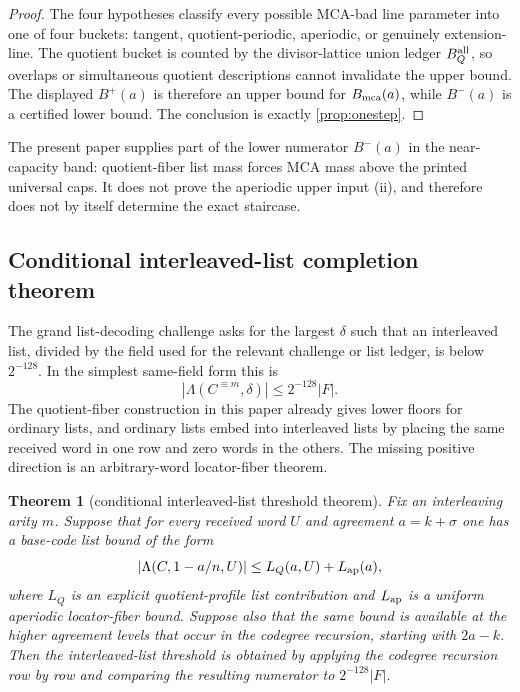 \documentclass[11pt]{article}
\newtheorem{theorem}{Theorem}[section]
\theoremstyle{definition}
\theoremstyle{remark}
\begin{document}
\begin{proof}
The four hypotheses classify every possible MCA-bad line parameter into one of
four buckets: tangent, quotient-periodic, aperiodic, or genuinely extension-line.
The quotient bucket is counted by the divisor-lattice union ledger $B_Q^{\rm all}$,
so overlaps or simultaneous quotient descriptions cannot invalidate the upper
bound.  The displayed $B^+(a)$ is therefore an upper bound for $B_{\rm mca}(a)$, while
$B^-(a)$ is a certified lower bound.  The conclusion is exactly
\cref{prop:onestep}.
\end{proof}

The present paper supplies part of the lower numerator $B^-(a)$ in the
near-capacity band: quotient-fiber list mass forces MCA mass above the printed
universal caps.  It does not prove the aperiodic upper input (ii), and therefore
does not by itself determine the exact staircase.

\subsection{Conditional interleaved-list completion theorem}

The grand list-decoding challenge asks for the largest $\delta$ such that an
interleaved list, divided by the field used for the relevant challenge or list
ledger, is below $2^{-128}$.  In the simplest same-field form this is
\[
        |\Lambda(C^{\equiv m},\delta)|\le 2^{-128}|F| .
\]
The quotient-fiber construction in this paper already gives lower floors for
ordinary lists, and ordinary lists embed into interleaved lists by placing the
same received word in one row and zero words in the others.  The missing
positive direction is an arbitrary-word locator-fiber theorem.

\begin{theorem}[conditional interleaved-list threshold theorem]\label{thm:conditional-list}
Fix an interleaving arity $m$.  Suppose that for every received word $U$ and
agreement $a=k+\sigma$ one has a base-code list bound of the form
\[
        |\Lambda(C,1-a/n,U)|
        \le
        L_Q(a,U)+L_{\rm ap}(a),
\]
where $L_Q$ is an explicit quotient-profile list contribution and
$L_{\rm ap}$ is a uniform aperiodic locator-fiber bound.  Suppose also that the
same bound is available at the higher agreement levels that occur in the
codegree recursion, starting with $2a-k$.  Then the interleaved-list threshold is
obtained by applying the codegree recursion row by row and comparing the
resulting numerator to $2^{-128}|F|$.
\end{theorem}
\end{document}
